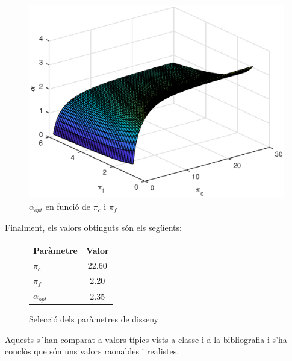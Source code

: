 \begin{itemize}
\begin{figure}[H]
	\includegraphics[scale=0.6]{./pics/alpha_pc_pf}
	\caption{$\alpha_{opt}$ en funció de $\pi_c$ i $\pi_f$}
\end{figure}
\end{itemize}
Finalment, els valors obtinguts són els següents:
\begin{figure}[H]
	\centering
	\begin{tabular}{lc}
		\toprule[3pt]
		\textbf{Paràmetre}&\textbf{Valor}\\
		\midrule[1pt]
		$\pi_{c}$ & 22.60 \\
		$\pi_{f}$ & 2.20 \\
		$\alpha_{opt}$ & 2.35 \\
		\bottomrule[2pt]
	\end{tabular}
	\label{C_opti2}
	\caption{Selecció dels paràmetres de disseny}
\end{figure}
Aquests s´han comparat a valors típics vists a classe i a la bibliografia i s'ha conclòs que són uns valors raonables i realistes.


